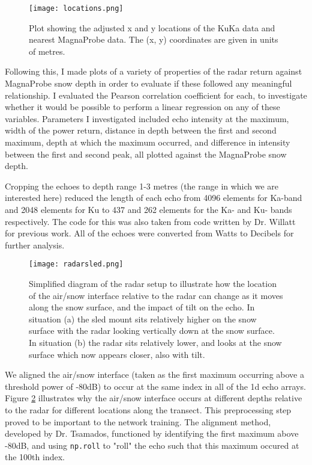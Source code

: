 \documentclass[11pt, a4paper]{article}
\begin{document}
\begin{figure}[H]
\centering
   		 \texttt{[image: locations.png]}
    		\caption{Plot showing the adjusted x and y locations of the KuKa data and nearest MagnaProbe data. The (x, y) coordinates are given in units of metres.}
	\label{fig:xyloc}
\end{figure}

Following this,  I made plots of a variety of properties of the radar return against MagnaProbe snow depth in order to evaluate if these followed any meaningful relationship.  I evaluated the Pearson correlation coefficient for each, to investigate whether it would be possible to perform a linear regression on any of these variables.  Parameters I investigated included echo intensity at the maximum, width of the power return, distance in depth between the first and second maximum, depth at which the maximum occurred,  and difference in intensity between the first and second peak, all plotted against the MagnaProbe snow depth.

Cropping the echoes to depth range 1-3 metres (the range in which we are interested here) reduced the length of each echo from 4096 elements for Ka-band and 2048 elements for Ku to 437 and 262 elements for the Ka- and Ku- bands respectively.  The code for this was also taken from code written by Dr.  Willatt for previous work. All of the echoes were converted from Watts to Decibels for further analysis.

\begin{figure}[H]
   		 \texttt{[image: radarsled.png]}
    		\caption{Simplified diagram of the radar setup to illustrate how the location of the air/snow interface relative to the radar can change as it moves along the snow surface,  and the impact of tilt on the echo. In situation (a) the sled mount sits relatively higher on the snow surface with the radar looking vertically down at the snow surface. In situation (b) the radar sits relatively lower, and looks at the snow surface which now appears closer, also with tilt.}
	\label{fig:sled}
\end{figure}

We aligned the air/snow interface (taken as the first maximum occurring above a threshold power of -80dB) to occur at the same index in all of the 1d echo arrays.  Figure \ref{fig:sled} illustrates why the air/snow interface occurs at different depths relative to the radar for different locations along the transect.  This preprocessing step proved to be important to the network training.  The alignment method, developed by Dr. Tsamados,  functioned by identifying the first maximum above -80dB, and using \verb|np.roll| to "roll" the echo such that this maximum occured at the 100th index.
 
\end{document}
